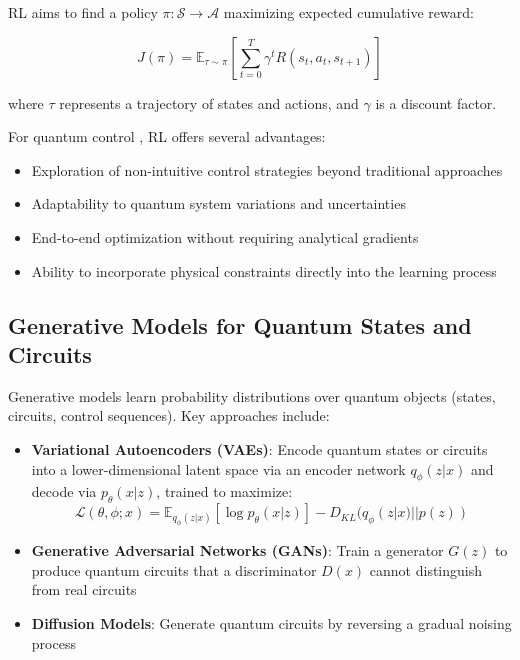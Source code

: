 RL aims to find a policy $\pi: \mathcal{S} \rightarrow \mathcal{A}$ maximizing expected cumulative reward:

\begin{equation}
J(\pi) = \mathbb{E}_{\tau \sim \pi}\left[\sum_{t=0}^{T} \gamma^t R(s_t, a_t, s_{t+1})\right]
\end{equation}

where $\tau$ represents a trajectory of states and actions, and $\gamma$ is a discount factor.

For quantum control \cite{bukov2018reinforcement}, RL offers several advantages:
\begin{itemize}
    \item Exploration of non-intuitive control strategies beyond traditional approaches
    \item Adaptability to quantum system variations and uncertainties
    \item End-to-end optimization without requiring analytical gradients
    \item Ability to incorporate physical constraints directly into the learning process
\end{itemize}

\subsection{Generative Models for Quantum States and Circuits}
Generative models learn probability distributions over quantum objects (states, circuits, control sequences). Key approaches include:

\begin{itemize}
    \item \textbf{Variational Autoencoders (VAEs)}: Encode quantum states or circuits into a lower-dimensional latent space via an encoder network $q_\phi(z|x)$ and decode via $p_\theta(x|z)$, trained to maximize:
    \begin{equation}
    \mathcal{L}(\theta, \phi; x) = \mathbb{E}_{q_\phi(z|x)}[\log p_\theta(x|z)] - D_{KL}(q_\phi(z|x) || p(z))
    \end{equation}
    
    \item \textbf{Generative Adversarial Networks (GANs)}: Train a generator $G(z)$ to produce quantum circuits that a discriminator $D(x)$ cannot distinguish from real circuits
    
    \item \textbf{Diffusion Models}: Generate quantum circuits by reversing a gradual noising process \cite{furrutter2024quantum}
\end{itemize}

